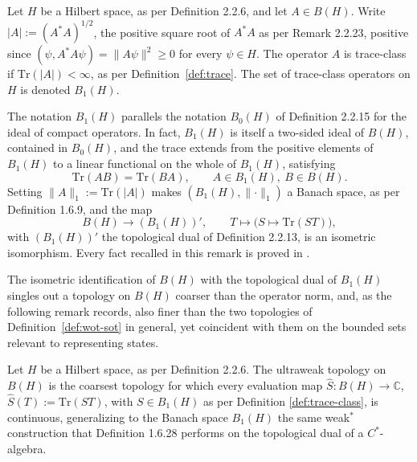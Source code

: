 \begin{definition}\label{def:trace-class}
	Let $H$ be a Hilbert space, as per Definition 2.2.6, and let
	$A \in B(H)$. Write $|A| := (A^*A)^{1/2}$, the positive square root of
	$A^*A$ as per Remark 2.2.23, positive since
	$(\psi, A^*A\psi) = \lVert A\psi \rVert^2 \geq 0$ for every $\psi \in
	H$. The operator $A$ is trace-class if $\mathrm{Tr}(|A|) < \infty$, as
	per Definition~\ref{def:trace}. The set of trace-class operators on $H$
	is denoted $B_1(H)$.
\end{definition}

\begin{remark}
	The notation $B_1(H)$ parallels the notation $B_0(H)$ of Definition
	2.2.15 for the ideal of compact operators. In fact, $B_1(H)$ is itself
	a two-sided ideal of $B(H)$, contained in $B_0(H)$, and the trace
	extends from the positive elements of $B_1(H)$ to a linear functional
	on the whole of $B_1(H)$, satisfying
	\[
	\mathrm{Tr}(AB) = \mathrm{Tr}(BA), \qquad A \in B_1(H), \ B \in B(H).
	\]
	Setting $\lVert A \rVert_1 := \mathrm{Tr}(|A|)$ makes
	$(B_1(H), \lVert \cdot \rVert_1)$ a Banach space, as per Definition
	1.6.9, and the map
	\[
	B(H) \to (B_1(H))', \qquad T \mapsto \big( S \mapsto \mathrm{Tr}(ST)
	\big),
	\]
	with $(B_1(H))'$ the topological dual of Definition 2.2.13, is an
	isometric isomorphism.\label{eq:trace-duality-remark} Every fact
	recalled in this remark is proved in \cite[TODO: collocazione
	precisa]{TODO-traceclass}.
\end{remark}

The isometric identification of $B(H)$ with the topological dual of
$B_1(H)$ singles out a topology on $B(H)$ coarser than the operator
norm, and, as the following remark records, also finer than the two
topologies of Definition~\ref{def:wot-sot} in general, yet coincident
with them on the bounded sets relevant to representing states.

\begin{definition}\label{def:ultraweak}
	Let $H$ be a Hilbert space, as per Definition 2.2.6. The ultraweak
	topology on $B(H)$ is the coarsest topology for which every evaluation
	map $\widehat{S} : B(H) \to \mathbb{C}$, $\widehat{S}(T) :=
	\mathrm{Tr}(ST)$, with $S \in B_1(H)$ as per Definition
	\ref{def:trace-class}, is continuous, generalizing to the Banach space
	$B_1(H)$ the same weak$^*$ construction that Definition 1.6.28 performs
	on the topological dual of a $C^*$-algebra.
\end{definition}

